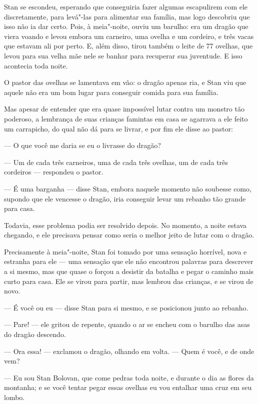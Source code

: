 Stan se escondeu, esperando que conseguiria fazer algumas escapulirem
com ele discretamente, para levá"-las para alimentar sua família, mas
logo descobriu que isso não ia dar certo. Pois, à meia"-noite, ouviu um
barulho: era um dragão que viera voando e levou embora um carneiro,
uma ovelha e um cordeiro, e três vacas que estavam ali por perto. E,
além disso, tirou também o leite de 77 ovelhas, que levou para sua
velha mãe nele se banhar para recuperar sua juventude. E isso
acontecia toda noite.

O pastor das ovelhas se lamentava em vão: o dragão apenas ria, e Stan viu que
aquele não era um bom lugar para conseguir comida para sua família.

Mas apesar de entender que era quase impossível lutar contra um
monstro tão poderoso, a lembrança de suas crianças famintas em casa
se agarrava a ele feito um carrapicho, do qual não dá para se livrar,
e por fim ele disse ao pastor:

--- O que você me daria se eu o livrasse do dragão?

--- Um de cada três carneiros, uma de cada três ovelhas, um de cada três
cordeiros --- respondeu o pastor.

--- É uma barganha --- disse Stan, embora naquele momento não soubesse			%
como, supondo que ele vencesse o dragão, iria conseguir levar um
rebanho tão grande para casa.

Todavia, esse problema podia ser resolvido depois. No momento, a noite
estava chegando, e ele precisava pensar como seria o melhor jeito de
lutar com o dragão.

Precisamente à meia"-noite, Stan foi tomado por uma sensação horrível,
nova e estranha para ele --- uma sensação que ele não encontrou
palavras para descrever a si mesmo, mas que quase o forçou a desistir
da batalha e pegar o caminho mais curto para casa. Ele se virou para
partir, mas lembrou das crianças, e se virou de novo.

--- É você ou eu --- disse Stan para si mesmo, e se posicionou junto ao
rebanho.

--- Pare! --- ele gritou de repente, quando o ar se encheu com o barulho
das asas do dragão descendo.

--- Ora essa! --- exclamou o dragão, olhando em volta. --- Quem é você, e de
onde vem? 

--- Eu sou Stan Bolovan, que come pedras toda noite, e durante o dia as
flores da montanha; e se você tentar pegar essas ovelhas eu vou entalhar
uma cruz em seu lombo.


